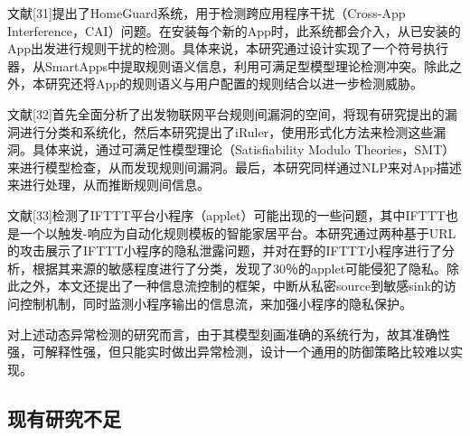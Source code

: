 文献[31]提出了HomeGuard系统，用于检测跨应用程序干扰（Cross-App Interference，CAI）问题。在安装每个新的App时，此系统都会介入，从已安装的App出发进行规则干扰的检测。具体来说，本研究通过设计实现了一个符号执行器，从SmartApps中提取规则语义信息，利用可满足型模型理论检测冲突。除此之外，本研究还将App的规则语义与用户配置的规则结合以进一步检测威胁。

文献[32]首先全面分析了出发物联网平台规则间漏洞的空间，将现有研究提出的漏洞进行分类和系统化，然后本研究提出了iRuler，使用形式化方法来检测这些漏洞。具体来说，通过可满足性模型理论（Satisfiability Modulo Theories，SMT）来进行模型检查，从而发现规则间漏洞。最后，本研究同样通过NLP来对App描述来进行处理，从而推断规则间信息。

文献[33]检测了IFTTT平台小程序（applet）可能出现的一些问题，其中IFTTT也是一个以触发-响应为自动化规则模板的智能家居平台。本研究通过两种基于URL的攻击展示了IFTTT小程序的隐私泄露问题，并对在野的IFTTT小程序进行了分析，根据其来源的敏感程度进行了分类，发现了30％的applet可能侵犯了隐私。除此之外，本文还提出了一种信息流控制的框架，中断从私密source到敏感sink的访问控制机制，同时监测小程序输出的信息流，来加强小程序的隐私保护。

对上述动态异常检测的研究而言，由于其模型刻画准确的系统行为，故其准确性强，可解释性强，但只能实时做出异常检测，设计一个通用的防御策略比较难以实现。

\subsection{现有研究不足}

